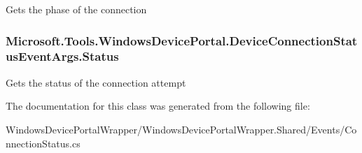 Gets the phase of the connection 

\subsubsection[{\texorpdfstring{Status}{Status}}]{ Microsoft.\+Tools.\+Windows\+Device\+Portal.\+Device\+Connection\+Status\+Event\+Args.\+Status\hspace{0.3cm}{\ttfamily [get]}}\hypertarget{class_microsoft_1_1_tools_1_1_windows_device_portal_1_1_device_connection_status_event_args_a7f2688e4f3d9f1197da47e978039e9e3}{}\label{class_microsoft_1_1_tools_1_1_windows_device_portal_1_1_device_connection_status_event_args_a7f2688e4f3d9f1197da47e978039e9e3}


Gets the status of the connection attempt 



The documentation for this class was generated from the following file\+:\begin{DoxyCompactItemize}
\item 
Windows\+Device\+Portal\+Wrapper/\+Windows\+Device\+Portal\+Wrapper.\+Shared/\+Events/Connection\+Status.\+cs\end{DoxyCompactItemize}
